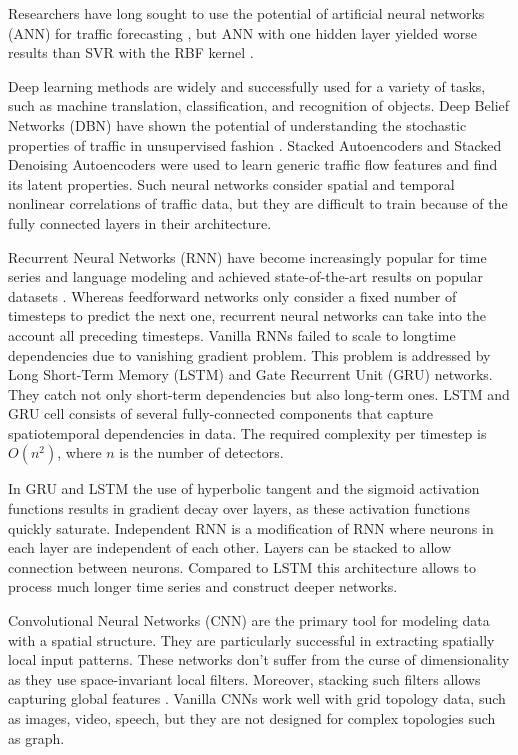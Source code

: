\documentclass[letterpaper, 10 pt, conference]{ieeeconf}  %
\begin{document}
Researchers have long sought to use the potential of artificial neural networks (ANN) for traffic forecasting \cite{Jun2008}, but ANN with one hidden layer yielded worse results than SVR with the RBF kernel \cite{Lippi2013}.

Deep learning methods are widely and successfully used for a variety of tasks, such as machine translation, classification, and recognition of objects. Deep Belief Networks (DBN) have shown the potential of understanding the stochastic properties of traffic in unsupervised fashion \cite{Huang2014}. Stacked Autoencoders \cite{Lv2014} and Stacked Denoising Autoencoders \cite{Chen2016} were used to learn generic traffic flow features and find its latent properties. Such neural networks consider spatial and temporal  nonlinear correlations of traffic data, but they are difficult to train because of the fully connected layers in their architecture.

Recurrent Neural Networks (RNN) have become increasingly popular for time series and language modeling and achieved state-of-the-art results on popular datasets \cite{Greff2017}. Whereas feedforward networks only consider a fixed number of timesteps to predict the next one, recurrent neural networks can take into the account all preceding timesteps. Vanilla RNNs failed to scale to longtime dependencies due to vanishing gradient problem. This problem is addressed by Long Short-Term Memory (LSTM) \cite{Hochreiter1997} and Gate Recurrent Unit (GRU) \cite{Cho2014} networks. They catch not only short-term dependencies but also long-term ones. LSTM and GRU cell consists of several fully-connected components that capture spatiotemporal dependencies in data. The required complexity per timestep is $O(n^2)$, where $n$ is the number of detectors. 

In GRU and LSTM the use of hyperbolic tangent and the sigmoid activation functions results in gradient decay over layers, as these activation functions quickly saturate. Independent RNN \cite{Li2018} is a modification of RNN where neurons in each layer are independent of each other. Layers can be stacked to allow connection between neurons. Compared to LSTM this architecture allows to process much longer time series and construct deeper networks.

Convolutional Neural Networks (CNN) are the primary tool for modeling data with a spatial structure. They are particularly successful in extracting spatially local input patterns. These networks don’t suffer from the curse of dimensionality as they use space-invariant local filters. Moreover, stacking such filters allows capturing global features \cite{LeCun1998}. Vanilla CNNs work well with grid topology data, such as images, video, speech, but they are not designed for complex topologies such as graph.
\end{document}
